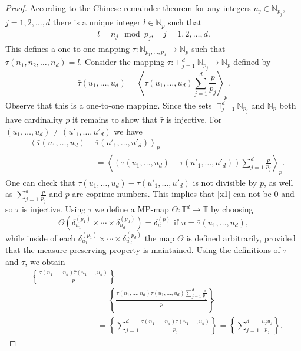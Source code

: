 \documentclass[10pt,a4paper]{amsart}
\def\ZN{\ensuremath{\mathbb N}}
\def\ZT{\ensuremath{\mathbb T}}
\newcommand {\e }[1]{\eqref{#1}}
\begin{document}
\begin{proof}
According to the Chinese remainder theorem for any integers  $n_j\in \ZN_{p_j}$, $j=1,2,\ldots,d$ there is a unique integer $l\in \ZN_{p}$ such that
\begin{align*}
	l=n_j\mod p_j,\quad j=1,2,\ldots,d.
\end{align*}
This defines a one-to-one mapping  $\tau:\ZN_{p_1,\ldots,p_d}\to \ZN_{p}$ such that $\tau(n_1,n_2,\ldots, n_d)=l$. Consider the mapping $\bar \tau:\sqcap_{j=1}^d\ZN_{p_j}\to \ZN_{p}$ defined by
\begin{equation*}
	\bar\tau(u_1,\ldots,u_d)=\left\langle\tau(u_1,\ldots,u_d)\sum_{j=1}^d\frac{p}{p_j}\right\rangle_p.
\end{equation*}
Observe that this is a one-to-one mapping. 
Since the sets $\sqcap_{j=1}^d\ZN_{p_j}$ and $\ZN_{p}$ both have cardinality $p$ it remains to show that  $\bar \tau$ is injective. For $ (u_1,\ldots,u_d)\neq (u'_1,\ldots,u'_d)$ we have
	\begin{align}
		&\left\langle\bar \tau (u_1,\ldots,u_d)-\bar \tau(u'_1,\ldots,u'_d)\right\rangle_p\\
		&\qquad\qquad\qquad\qquad =\left\langle	(\tau (u_1,\ldots,u_d)- \tau(u'_1,\ldots,u'_d))\sum_{j=1}^d\frac{p}{p_j}\right\rangle_p.\label{x1}
	\end{align}
	One can check that $\tau (u_1,\ldots,u_d)- \tau(u'_1,\ldots,u'_d)$ is not divisible by $p$, as well as  $\sum_{j=1}^d\frac{p}{p_j}$ and $p$ are coprime numbers. This implies that \e{x1} can not be $0$ and so $\bar \tau$ is injective. Using $\bar\tau$ we define a MP-map $\Theta:\ZT^d\to \ZT$ by choosing 
	\begin{equation*}
		\Theta(\delta_{u_1}^{(p_1)}\times \cdots\times \delta_{u_d}^{(p_d)})=\delta^{(p)}_u \text{ if } u=\bar \tau(u_1,\ldots,u_d),
	\end{equation*}
while inside of each $\delta_{u_1}^{(p_1)}\times \cdots\times \delta_{u_d}^{(p_d)}$ the map $\Theta$ is defined arbitrarily,  provided that the measure-preserving property is maintained. Using the definitions of $\tau$ and $\bar \tau$, we obtain
\begin{align*}
	&\left\{\frac{\tau(n_1,\ldots,n_d)\bar \tau(u_1,\ldots,u_d)}{p}\right\}\\
	&\qquad\qquad\qquad\qquad=	\left\{\frac{\tau(n_1,\ldots,n_d)\tau(u_1,\ldots,u_d)\sum_{j=1}^d\frac{p}{p_j}}{p}\right\}\\
	&\qquad\qquad\qquad\qquad=	\left\{\sum_{j=1}^d\frac{\tau(n_1,\ldots,n_d)\tau(u_1,\ldots,u_d)}{p_j}\right\}=\left\{\sum_{j=1}^d\frac{n_ju_j}{p_j}\right\}.

\end{align*}
\end{proof}
\end{document}
